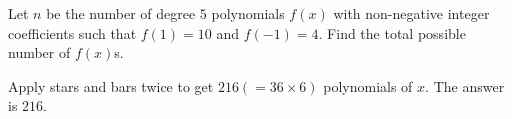 \begin{problem}
Let $n$ be the number of degree $5$ polynomials $f(x)$ with non-negative integer coefficients such that $f(1)=10$ and $f(-1)=4$. Find the total possible number of $f(x)$s.
\end{problem}

\begin{solution}
Apply stars and bars twice to get $216(=36\times6)$ polynomials of $x$. The answer is $216$.
\end{solution}